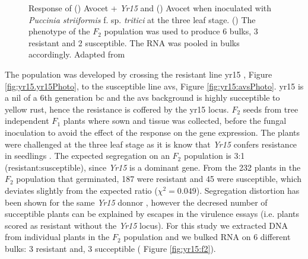 \begin{figure}
    \caption{Response of () Avocet + \textit{Yr15} and () Avocet when inoculated with \textit{Puccinia striiformis} f. sp.  \textit{tritici} at the three leaf stage. () The phenotype of the $F_{2}$ population was used to produce 6 bulks, 3 resistant and 2 susceptible. The RNA was pooled in bulks accordingly. Adapted from \citep{Ramirez-Gonzalez2015b}}

\end{figure}

The population was developed by crossing the resistant line \gls{yr15} \citep{Wellings1998}, Figure \ref{fig:yr15.yr15Photo}, to the susceptible line \gls{avs}, Figure \ref{fig:yr15:avsPhoto}. 
\acrshort{yr15} is a \gls{nil} of a 6th generation \gls{bc} and the \acrshort{avs} background is highly succeptible to yellow rust, hence the resistance is coffered by the \acrshort{yr15} locus. 
$F_{2}$ seeds from tree independent $F_{1}$ plants where sown and tissue was collected, before the fungal inoculation to avoid the effect of the response on the gene expression.  
The plants were challenged at the three leaf stage as it is know that \textit{Yr15} confers resistance in seedlings \citep{Gerechter-Amitai1989}.
The expected segregation on an $F_{2}$ population is 3:1 (resistant:susceptible), since \textit{Yr15} is a dominant gene.
From the 232 plants in the $F_{2}$ population that germinated, 187 were resistant and 45 were susceptible, which deviates slightly from the expected ratio ($\chi^{2}=0.049$).
Segregation distortion has been shown for the same \textit{Yr15} donnor \citep{Randhawa2009}, however the decresed number of succeptible plants can be explained by escapes in the virulence essays (i.e. plants scored as resistant without the \textit{Yr15} locus).   For this study we extracted DNA from individual plants in the $F_{2}$ population and we bulked RNA on 6 different bulks: 3 resistant and, 3 succeptible ( Figure \ref{fig:yr15:f2}). 

